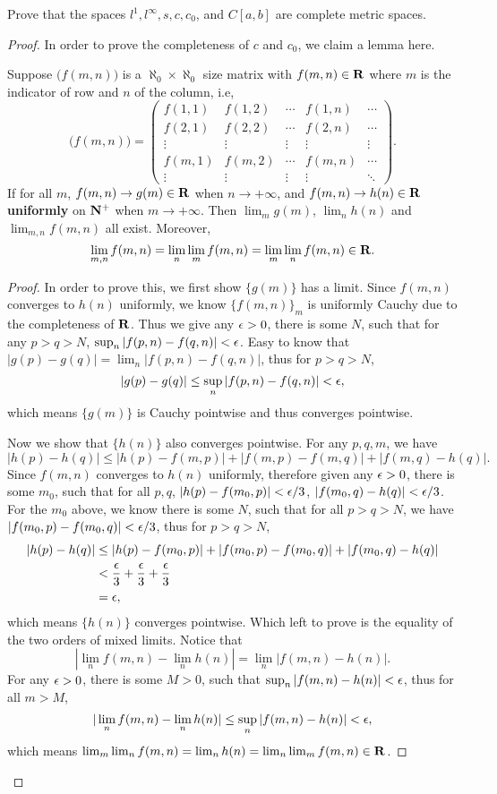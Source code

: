 \begin{pro}%
	Prove that the spaces $l^1,l^{\infty},s,c,c_0$, and $C[a,b]$ are complete metric spaces. 
\end{pro}
\begin{proof}
	In order to prove the completeness of $c$ and $c_0$, we claim a lemma here.
	\begin{lem}
		Suppose $\big(f(m,n)\big)$ is a $\aleph_0\times \aleph_0$ size matrix with $f(m,n)\in \mathbf{R}$ where $m$ is the indicator of row and $n$ of the column, i.e,
		\[\big(f(m,n)\big)=
		\begin{pmatrix}
		f(1,1)&f(1,2)&\cdots&f(1,n)&\cdots\\
		f(2,1)&f(2,2)&\cdots&f(2,n)&\cdots\\
		\vdots&\vdots&\vdots&\vdots&\vdots\\
		f(m,1)&f(m,2)&\cdots&f(m,n)&\cdots\\
		\vdots&\vdots&\vdots&\vdots&\ddots
		\end{pmatrix}.\]
		If for all $m$, $f(m,n)\to g(m)\in \mathbf{R}$ when $n\to+\infty$, and $f(m,n)\to h(n)\in\mathbf{R}$ \textbf{uniformly} on $\mathbf{N}^+$ when $m\to+\infty$. Then $\lim_m g(m)$, $\lim_n h(n)$ and $\lim_{m,n} f(m,n)$ all exist. Moreover,
		\[\lim_{m,n} f(m,n)=\lim_n\lim_m f(m,n)=\lim_m\lim_n f(m,n)\in\mathbf{R}.\]
	\end{lem}
	\begin{proof}
		In order to prove this, we first show $\{g(m)\}$ has a limit. Since $f(m,n)$ converges to $h(n)$ uniformly, we know $\{f(m,n)\}_m$ is uniformly Cauchy due to the completeness of $\mathbf{R}$. Thus we give any $\epsilon>0$, there is some $N$, such that for any $p>q>N$, $\sup_n|f(p,n)-f(q,n)|<\epsilon$. Easy to know that $|g(p)-g(q)|=\lim_n|f(p,n)-f(q,n)|$, thus for $p>q>N$, 
		\[|g(p)-g(q)|\leq \sup_n|f(p,n)-f(q,n)|<\epsilon,\]
		which means $\{g(m)\}$ is Cauchy pointwise and thus converges pointwise. 

		Now we show that $\{h(n)\}$ also converges pointwise. For any $p,q,m$, we have
		\[|h(p)-h(q)|\leq|h(p)-f(m,p)|+|f(m,p)-f(m,q)|+|f(m,q)-h(q)|.\]
		Since $f(m,n)$ converges to $h(n)$ uniformly, therefore given any $\epsilon>0$, there is some $m_0$, such that for all $p,q$, $|h(p)-f(m_0,p)|<\epsilon/3$, $|f(m_0,q)-h(q)|<\epsilon/3$. For the $m_0$ above, we know there is some $N$, such that for all $p>q>N$, we have $|f(m_0,p)-f(m_0,q)|<\epsilon/3$, thus for $p>q>N$,
		\begin{align*}
		|h(p)-h(q)|&\leq|h(p)-f(m_0,p)|+|f(m_0,p)-f(m_0,q)|+|f(m_0,q)-h(q)|\\
				   &<\frac{\epsilon}{3}+\frac{\epsilon}{3}+\frac{\epsilon}{3}\\
				   &=\epsilon,
		\end{align*}
		which means $\{h(n)\}$ converges pointwise. Which left to prove is the equality of the two orders of mixed limits. Notice that 
		\[|\lim_n f(m,n)-\lim_n h(n)|=\lim_n |f(m,n)-h(n)|.\]
		For any $\epsilon>0$, there is some $M>0$, such that $\sup_n|f(m,n)-h(n)|<\epsilon$, thus for all $m>M$,
		\[|\lim_n f(m,n)-\lim_n h(n)|\leq \sup_n|f(m,n)-h(n)|<\epsilon,\]
		which means $\lim_m\lim_n f(m,n)=\lim_n h(n)=\lim_n \lim_m f(m,n)\in\mathbf{R}$.


\end{proof}
\end{proof}
